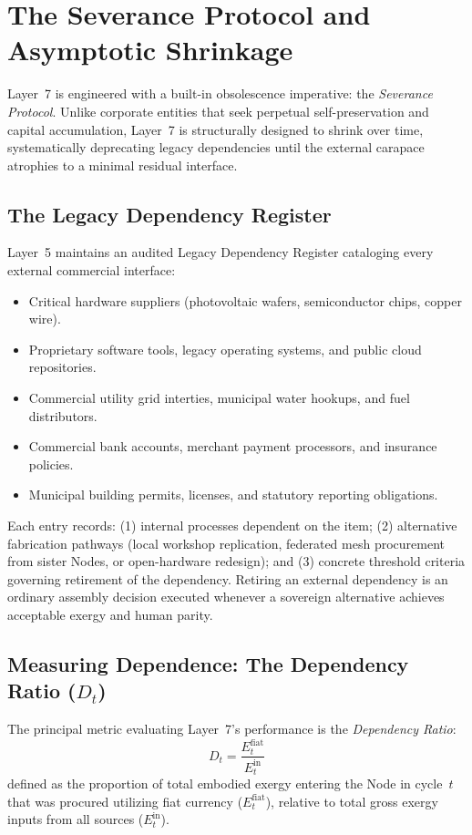 \section{The Severance Protocol and Asymptotic Shrinkage}
\label{sec:l7-severance}

Layer~7 is engineered with a built-in obsolescence imperative: the \textit{Severance Protocol}. Unlike corporate entities that seek perpetual self-preservation and capital accumulation, Layer~7 is structurally designed to shrink over time, systematically deprecating legacy dependencies until the external carapace atrophies to a minimal residual interface.

\subsection{The Legacy Dependency Register}

Layer~5 maintains an audited Legacy Dependency Register cataloging every external commercial interface:
\begin{itemize}
  \item Critical hardware suppliers (photovoltaic wafers, semiconductor chips, copper wire).
  \item Proprietary software tools, legacy operating systems, and public cloud repositories.
  \item Commercial utility grid interties, municipal water hookups, and fuel distributors.
  \item Commercial bank accounts, merchant payment processors, and insurance policies.
  \item Municipal building permits, licenses, and statutory reporting obligations.
\end{itemize}
Each entry records: (1) internal processes dependent on the item; (2) alternative fabrication pathways (local workshop replication, federated mesh procurement from sister Nodes, or open-hardware redesign); and (3) concrete threshold criteria governing retirement of the dependency. Retiring an external dependency is an ordinary assembly decision executed whenever a sovereign alternative achieves acceptable exergy and human parity.

\subsection{\texorpdfstring{Measuring Dependence: The Dependency Ratio ($D_t$)}{Measuring Dependence: The Dependency Ratio (Dt)}}

The principal metric evaluating Layer~7's performance is the \textit{Dependency Ratio}:
\begin{equation}
  D_t = \frac{E^{\mathrm{fiat}}_t}{E^{\mathrm{in}}_t}
  \label{eq:dependency_ratio}
\end{equation}
defined as the proportion of total embodied exergy entering the Node in cycle~$t$ that was procured utilizing fiat currency ($E^{\mathrm{fiat}}_t$), relative to total gross exergy inputs from all sources ($E^{\mathrm{in}}_t$).

